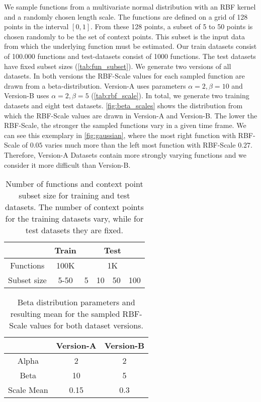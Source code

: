 We sample functions from a multivariate normal distribution with an RBF kernel and a randomly chosen length scale. The functions are defined on a grid of 128 points in the interval $[0,1]$. From these 128 points, a subset of 5 to 50 points is chosen randomly to be the set of context points. This subset is the input data from which the underlying function must be estimated. Our train datasets consist of 100.000 functions and test-datasets consist of 1000 functions. The test datasets have fixed subset sizes (\autoref{tab:fun_subset}). We generate two versions of all datasets. In both versions the RBF-Scale values for each sampled function are drawn from a beta-distribution. Version-A uses parameters $\alpha = 2, \beta = 10$ and Version-B uses $\alpha = 2, \beta = 5$ (\autoref{tab:rbf_scale}). In total, we generate two training datasets and eight test datasets. \autoref{fig:beta_scales} shows the distribution from which the RBF-Scale values are drawn in Version-A and Version-B. The lower the RBF-Scale, the stronger the sampled functions vary in a given time frame. We can see this exemplary in \autoref{fig:gaussian}, where the most right function with RBF-Scale of $0.05$ varies much more than the left most function with RBF-Scale $0.27$. Therefore, Version-A Datasets contain more strongly varying functions and we consider it more difficult than Version-B.

\begin{table}[]
	\centering
	\caption{Number of functions and context point subset size for training and test datasets. The number of context points for the training datasets vary, while for test datasets they are fixed.}
	\begin{tabular}{c c c c c c}
		\toprule
		& Train & \multicolumn{4}{c}{Test}\\
		\midrule
		Functions & 100K & \multicolumn{4}{c}{1K}\\
		Subset size & 5-50 & 5 & 10 & 50 & 100  \\\bottomrule
	\end{tabular}
	\label{tab:fun_subset}
\end{table}

\begin{table}[]
	\centering
	\caption{Beta distribution parameters and resulting mean for the sampled RBF-Scale values for both dataset versions.}
	\begin{tabular}{c c c}
		\toprule
		& Version-A & Version-B\\
		\midrule
		Alpha & 2 & 2\\
		Beta & 10 & 5  \\\midrule
		Scale Mean & 0.15 & 0.3\\\bottomrule
	\end{tabular}
	\label{tab:rbf_scale}
\end{table}


